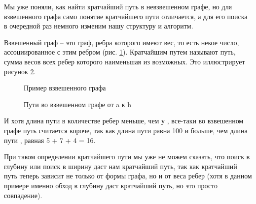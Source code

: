 \documentclass[../../article.tex]{subfiles}
\begin{document}
{Мы уже поняли, как найти кратчайший путь в невзвешенном графе, но для взвешенного графа само понятие кратчайшего пути отличается, а для его поиска в очередной раз немного изменим нашу структуру и алгоритм.}

Взвешенный граф – это граф, ребра которого имеют вес, то есть некое число, ассоциированное с этим ребром (рис. \ref{fig:weightedGraphExample}). Кратчайшим путем называют путь, сумма весов всех ребер которого наименьшая из возможных. Это иллюстрирует рисунок \ref{fig:compareWeightedPaths}.

\begin{figure}
    \caption{Пример взвешенного графа}
    \label{fig:weightedGraphExample}
\end{figure}

\begin{figure}
    \caption{Пути во взвешенном графе от {\firacodebold a} к {\firacodebold h}}
    \label{fig:compareWeightedPaths}
\end{figure}

И хотя длина пути {\firacodebold [a, h]} в количестве ребер меньше, чем у {\firacodebold [a, f, g, h]}, все-таки во взвешенном графе путь {\firacodebold [a, f, g, h]} считается короче, так как длина пути {\firacodebold [a, h]} равна 100 и больше, чем длина пути {\firacodebold [a, f, g, h]}, равная 5 + 7 + 4 = 16.

При таком определении кратчайшего пути мы уже не можем сказать, что поиск в глубину или поиск в ширину даст нам кратчайший путь, так как кратчайший путь теперь зависит не только от формы графа, но и от веса ребер (хотя в данном примере именно обход в глубину даст кратчайший путь, но это просто совпадение).
\end{document}

